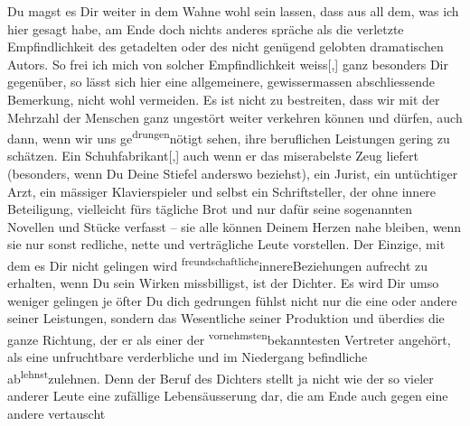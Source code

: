 \pstart
           Du magst es Dir weiter in dem Wahne wohl sein lassen, dass aus all dem, was ich hier
               gesagt habe, am Ende doch nichts anderes spräche als die verletzte Empfindlichkeit
               des getadelten oder des nicht genügend gelobten dramatischen Autors. So frei ich mich
               von solcher Empfindlichkeit weiss{[},{]} ganz besonders Dir gegenüber,
               so lässt sich hier eine \introOben{}allgemeinere\introOben{}, gewissermassen
               abschliessende Bemerkung, nicht wohl vermeiden. Es ist nicht zu bestreiten, dass wir
               mit der Mehrzahl der Menschen ganz ungestört weiter verkehren können und dürfen, auch
               dann, wenn wir uns ge\substVorne{}\textsuperscript{drungen}{\allowbreak}\substDazwischen{}nötigt\substHinten{} sehen, ihre beruflichen Leistungen gering zu schätzen. Ein
                  Schuhfabrikant{[},{]} auch wenn er das miserabelste Zeug liefert
               (besonders, wenn Du Deine Stiefel anderswo beziehst), ein \label{T_L03521-3v}\label{T_L03521-3h} Jurist, ein untüchtiger Arzt,
               ein mässiger Klavierspieler und selbst ein Schriftsteller, der ohne innere
               Beteiligung, vielleicht fürs tägliche Brot und nur dafür seine sogenannten Novellen
               und Stücke verfasst – sie alle können Deinem Herzen nahe bleiben, wenn sie nur sonst
               redliche, nette und verträgliche Leute vorstellen. Der Einzige, mit dem es Dir nicht
               gelingen wird \substVorne{}\textsuperscript{freundschaftliche}{\allowbreak}\substDazwischen{}innere\substHinten{}{ }{\pb}Beziehungen aufrecht zu erhalten,
               wenn Du sein Wirken missbilligst, ist der Dichter. Es wird Dir umso weniger gelingen
               je öfter Du \introOben{}dich gedrungen fühlst\introOben{} nicht nur die eine oder
               andere seiner Leistungen, sondern das Wesentliche seiner Produktion und überdies die
               ganze Richtung, der er als einer der \substVorne{}\textsuperscript{vornehmsten}{\allowbreak}\substDazwischen{}bekanntesten\substHinten{} Vertreter angehört, als eine unfruchtbare verderbliche und im Niedergang
               befindliche ab\substVorne{}\textsuperscript{lehnst}{\allowbreak}\substDazwischen{}zulehnen\substHinten{}. Denn der Beruf des Dichters stellt ja nicht wie der so vieler anderer Leute
               eine zufällige Lebensäusserung dar, die am Ende auch gegen eine andere vertauscht
